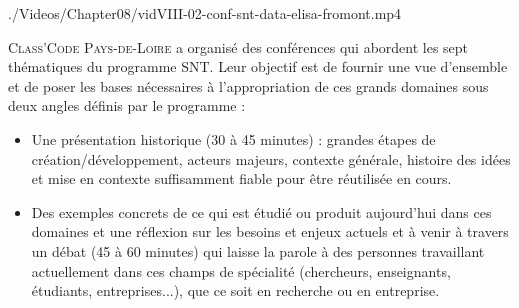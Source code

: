 \begin{marginvideo}
		{./Videos/Chapter08/vidVIII-02-conf-snt-data-elisa-fromont.mp4}%
\end{marginvideo}

\textsc{Class'Code} \textsc{Pays-de-Loire} a organisé des conférences qui abordent les sept thématiques du programme SNT. Leur objectif est de fournir une vue d’ensemble et de poser les bases nécessaires à l’appropriation de ces grands domaines sous deux angles définis par le programme :
\begin{itemize}
\item Une présentation historique (30 à 45 minutes) : grandes étapes de création/développement, acteurs majeurs, contexte générale, histoire des idées et mise en contexte suffisamment fiable pour être réutilisée en cours.
\item Des exemples concrets de ce qui est étudié ou produit aujourd’hui dans ces domaines et une réflexion sur les besoins et enjeux actuels et à venir à travers un débat (45 à 60 minutes) qui laisse la parole à des personnes travaillant actuellement dans ces champs de spécialité  (chercheurs, enseignants, étudiants, entreprises...), que ce soit en recherche ou en entreprise.
\end{itemize}

